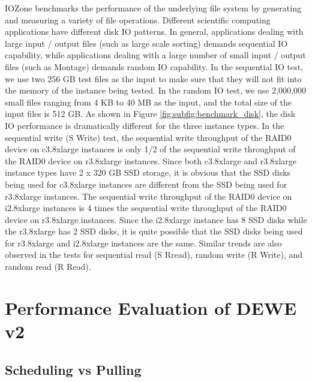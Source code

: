 IOZone benchmarks the performance of the underlying file system by generating and measuring a variety of file operations. Different scientific computing applications have different disk IO patterns. In general, applications dealing with large input / output files (such as large scale sorting) demands sequential IO capability, while applications dealing with a large number of small input / output files (such as Montage) demands random IO capability. In the sequential IO test, we use two 256 GB test files as the input to make sure that they will not fit into the memory of the instance being tested. In the random IO test, we use 2,000,000 small files ranging from 4 KB to 40 MB as the input, and the total size of the input files is 512 GB. As shown in Figure \ref{fig:subfig:benchmark_disk}, the disk IO performance is dramatically different for the three instance types. In the sequential write (S Write) test, the sequential write throughput of the RAID0 device on c3.8xlarge instances is only 1/2 of the sequential write throughput of the RAID0 device on r3.8xlarge instances. Since both c3.8xlarge and r3.8xlarge instance types have 2 x 320 GB SSD storage, it is obvious that the SSD disks being used for c3.8xlarge instances are different from the SSD being used for r3.8xlarge instances. The sequential write throughput of the RAID0 device on i2.8xlarge instances is 4 times the sequential write throughput of the RAID0 device on r3.8xlarge instances. Since the i2.8xlarge instance has 8 SSD disks while the r3.8xlarge has 2 SSD disks, it is quite possible that the SSD disks being used for r3.8xlarge and i2.8xlarge instances are the same. Similar trends are also observed in the tests for sequential read (S Rread), random write (R Write), and random read (R Read).


\section{Performance Evaluation of DEWE v2}
\label{v2_sec:dewe_v2_performance}


\subsection{Scheduling vs Pulling}
\label{sec:subsec:scheduling_vs_pulling}


